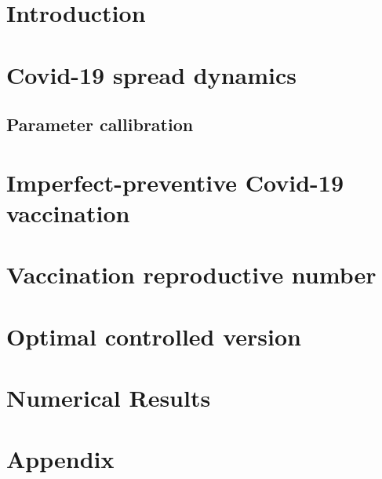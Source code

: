 \documentclass[sort&compress]{elsarticle}
\begin{document}
    
    \section{Introduction}
        
    \section{Covid-19 spread dynamics}
        
            \subsection{Parameter callibration}
            
    \section{Imperfect-preventive Covid-19 vaccination}
        
    \section{Vaccination reproductive number}
        
    \section{Optimal controlled version}
        
    \section{Numerical Results}
    \listofchanges[style=compactsummary]
    \appendix
  \section{Appendix}
    
  
  
\end{document}
